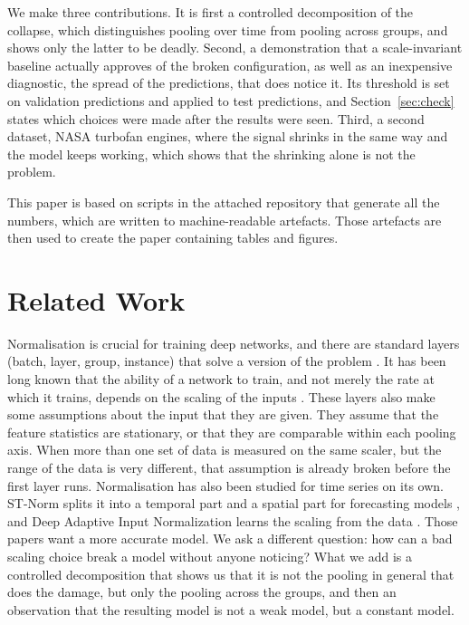 \documentclass[preprint,12pt,authoryear,doubleblind]{elsarticle}
\begin{document}
We make three contributions. It is first a controlled decomposition of the collapse, which distinguishes pooling over time from pooling across groups, and shows only the latter to be deadly. Second, a demonstration that a scale-invariant baseline actually approves of the broken configuration, as well as an inexpensive diagnostic, the spread of the predictions, that does notice it. Its threshold is set on validation predictions and applied to test predictions, and Section~\ref{sec:check} states which choices were made after the results were seen. Third, a second dataset, NASA turbofan engines, where the signal shrinks in the same way and the model keeps working, which shows that the shrinking alone is not the problem.

This paper is based on scripts in the attached repository that generate all the numbers, which are written to machine-readable artefacts. Those artefacts are then used to create the paper containing tables and figures.

\section{Related Work}
\label{sec:related}

Normalisation is crucial for training deep networks, and there are standard layers (batch, layer, group, instance) that solve a version of the problem \citep{ioffe2015,ba2016,wu2018,ulyanov2016,huang2023}. It has been long known that the ability of a network to train, and not merely the rate at which it trains, depends on the scaling of the inputs \citep{sola1997}. These layers also make some assumptions about the input that they are given. They assume that the feature statistics are stationary, or that they are comparable within each pooling axis. When more than one set of data is measured on the same scaler, but the range of the data is very different, that assumption is already broken before the first layer runs. Normalisation has also been studied for time series on its own. ST-Norm splits it into a temporal part and a spatial part for forecasting models \citep{deng2021}, and Deep Adaptive Input Normalization learns the scaling from the data \citep{passalis2020}. Those papers want a more accurate model. We ask a different question: how can a bad scaling choice break a model without anyone noticing? What we add is a controlled decomposition that shows us that it is not the pooling in general that does the damage, but only the pooling across the groups, and then an observation that the resulting model is not a weak model, but a constant model.
\end{document}
